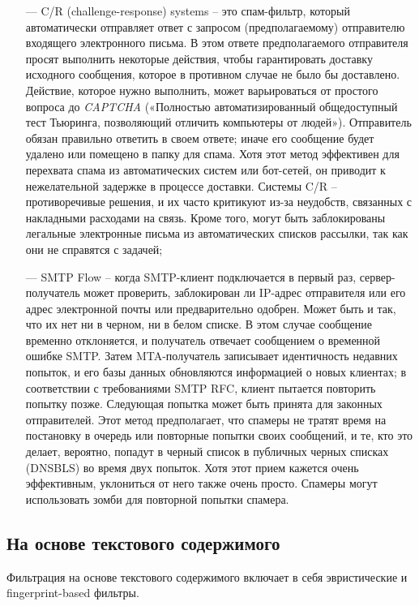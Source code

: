 \begin{itemize}
    \item[—] C/R (challenge-response) systems -- это спам-фильтр, который автоматически отправляет
        ответ с запросом (предполагаемому) отправителю входящего электронного письма. В этом
        ответе предполагаемого отправителя просят выполнить некоторые действия, чтобы гарантировать
        доставку исходного сообщения, которое в противном случае не было бы доставлено. Действие, которое
        нужно выполнить, может варьироваться от простого вопроса до \emph{CAPTCHA} («Полностью автоматизированный
        общедоступный тест Тьюринга, позволяющий отличить компьютеры от людей»). Отправитель обязан правильно
        ответить в своем ответе; иначе его сообщение будет удалено или помещено в папку для спама. Хотя этот
        метод эффективен для перехвата спама из автоматических систем или бот-сетей, он приводит к нежелательной
        задержке в процессе доставки.
        Системы C/R -- противоречивые решения, и их часто критикуют из-за неудобств, связанных с накладными расходами
        на связь. Кроме того, могут быть заблокированы легальные электронные письма из автоматических списков
        рассылки, так как они не справятся с задачей;
    \item[—] SMTP Flow -- когда SMTP-клиент подключается в первый раз, сервер-получатель может проверить,
        заблокирован ли IP-адрес отправителя или его адрес электронной почты или предварительно одобрен.
        Может быть и так, что их нет ни в черном, ни в белом списке. В этом случае сообщение временно отклоняется,
        и получатель отвечает сообщением о временной ошибке SMTP. Затем MTA-получатель записывает идентичность недавних попыток, и его базы данных обновляются информацией о новых клиентах; в соответствии с требованиями SMTP RFC, клиент пытается повторить попытку позже. Следующая попытка может быть принята для законных отправителей. Этот метод предполагает, что спамеры не тратят время на постановку в очередь или повторные попытки своих сообщений, и те, кто это делает, вероятно, попадут в черный список в публичных черных списках (DNSBLS) во время двух попыток. Хотя этот прием кажется очень эффективным, уклониться от него также очень просто. Спамеры могут использовать зомби для повторной попытки спамера.
\end{itemize}

\subsection{На основе текстового содержимого}
Фильтрация на основе текстового содержимого включает в себя эвристические и fingerprint-based фильтры.

